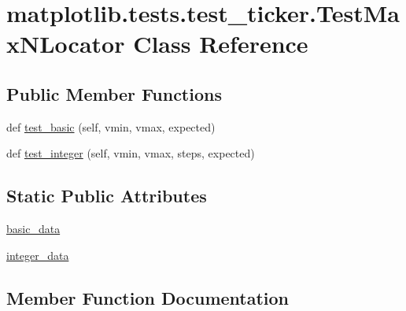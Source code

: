 \hypertarget{classmatplotlib_1_1tests_1_1test__ticker_1_1TestMaxNLocator}{}\section{matplotlib.\+tests.\+test\+\_\+ticker.\+Test\+Max\+N\+Locator Class Reference}
\label{classmatplotlib_1_1tests_1_1test__ticker_1_1TestMaxNLocator}
\subsection*{Public Member Functions}
\begin{DoxyCompactItemize}
\item 
def \hyperlink{classmatplotlib_1_1tests_1_1test__ticker_1_1TestMaxNLocator_a8a0283b1f0f6541a03454bc7f208f690}{test\+\_\+basic} (self, vmin, vmax, expected)
\item 
def \hyperlink{classmatplotlib_1_1tests_1_1test__ticker_1_1TestMaxNLocator_a43931a179ff684c0b276b97a8e4c6947}{test\+\_\+integer} (self, vmin, vmax, steps, expected)
\end{DoxyCompactItemize}
\subsection*{Static Public Attributes}
\begin{DoxyCompactItemize}
\item 
\hyperlink{classmatplotlib_1_1tests_1_1test__ticker_1_1TestMaxNLocator_aa20c2fd559f2fc4cfe2f78848051f17d}{basic\+\_\+data}
\item 
\hyperlink{classmatplotlib_1_1tests_1_1test__ticker_1_1TestMaxNLocator_a85cea85a8d16f96acf457c596a084fd1}{integer\+\_\+data}
\end{DoxyCompactItemize}


\subsection{Member Function Documentation}
\mbox{\label{classmatplotlib_1_1tests_1_1test__ticker_1_1TestMaxNLocator_a8a0283b1f0f6541a03454bc7f208f690}} 
